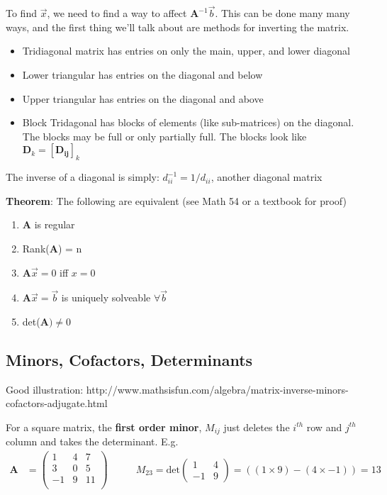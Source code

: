 \documentclass[12pt]{article}
\newcommand{\ve}[1]{\ensuremath{\mathbf{#1}}}
\begin{document}
To find $\vec{x}$, we need to find a way to affect $\ve{A}^{-1}\vec{b}$. This can be done many many ways, and the first thing we'll talk about are methods for inverting the matrix.

\begin{itemize}
\item Tridiagonal matrix has entries on only the main, upper, and lower diagonal
\item Lower triangular has entries on the diagonal and below
\item Upper triangular has entries on the diagonal and above 
\item Block Tridagonal has blocks of elements (like sub-matrices) on the diagonal. The blocks may be full or only partially full. The blocks look like $\ve{D}_k = [\ve{D_{ij}}]_k$
\end{itemize}

The inverse of a diagonal is simply: $d_{ii}^{-1} = 1/d_{ii}$, another diagonal matrix

\textbf{Theorem}: The following are equivalent (see Math 54 or a textbook for proof)
%
\begin{enumerate}
\item $\ve{A}$ is regular
\item Rank($\ve{A}$) = n
\item $\ve{A}\vec{x} = 0$ iff $x=0$
\item $\ve{A}\vec{x} = \vec{b}$ is uniquely solveable $\forall \vec{b}$
\item det($\ve{A}) \neq 0$
\end{enumerate}



\subsection{Minors, Cofactors, Determinants}

Good illustration: http://www.mathsisfun.com/algebra/matrix-inverse-minors-cofactors-adjugate.html


For a square matrix, the \textbf{first order minor}, $M_{ij}$ just deletes the $i^{th}$ row and $j^{th}$ column and takes the determinant. E.g.
%
\begin{align}
    \ve{A} &= \begin{pmatrix}
        1 & 4 & 7 \\
        3 & 0 & 5 \\
        -1 & 9 & 11 \\
    \end{pmatrix} 
    \qquad
    &M_{23} = \text{det}\begin{pmatrix}
       1 & 4 \\
       -1 & 9 
    \end{pmatrix}   
    = ((1 \times 9) - (4 \times -1)) = 13 \nonumber
\end{align} 
\end{document}
